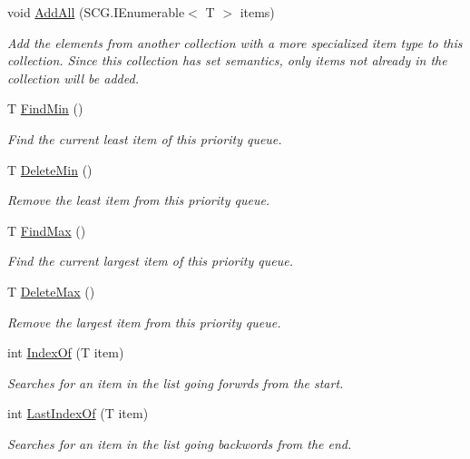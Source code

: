 \begin{DoxyCompactItemize}
void \hyperlink{class_c5_1_1_sorted_array_a0e6b1fe3965a889fc32511d281167ea4}{Add\+All} (S\+C\+G.\+I\+Enumerable$<$ T $>$ items)
\begin{DoxyCompactList}\small\item\em Add the elements from another collection with a more specialized item type to this collection. Since this collection has set semantics, only items not already in the collection will be added. \end{DoxyCompactList}\item 
T \hyperlink{class_c5_1_1_sorted_array_ae728f91290bd2f4c1e9316ef5173b4dd}{Find\+Min} ()
\begin{DoxyCompactList}\small\item\em Find the current least item of this priority queue. \end{DoxyCompactList}\item 
T \hyperlink{class_c5_1_1_sorted_array_ac1ca139859ae18a23085b15de92e813f}{Delete\+Min} ()
\begin{DoxyCompactList}\small\item\em Remove the least item from this priority queue. \end{DoxyCompactList}\item 
T \hyperlink{class_c5_1_1_sorted_array_aa5fd2c518f5a88dfcc1ea487d6a3bad6}{Find\+Max} ()
\begin{DoxyCompactList}\small\item\em Find the current largest item of this priority queue. \end{DoxyCompactList}\item 
T \hyperlink{class_c5_1_1_sorted_array_ac11ab35ceca944626fadd61d6cd32480}{Delete\+Max} ()
\begin{DoxyCompactList}\small\item\em Remove the largest item from this priority queue. \end{DoxyCompactList}\item 
int \hyperlink{class_c5_1_1_sorted_array_a20a6a1e7bead68d88ab599abb8aff039}{Index\+Of} (T item)
\begin{DoxyCompactList}\small\item\em Searches for an item in the list going forwrds from the start. \end{DoxyCompactList}\item 
int \hyperlink{class_c5_1_1_sorted_array_a1989414a3df7eaabc5ec2ff36f3f613e}{Last\+Index\+Of} (T item)
\begin{DoxyCompactList}\small\item\em Searches for an item in the list going backwords from the end. \end{DoxyCompactList}\item 

\end{DoxyCompactItemize}
